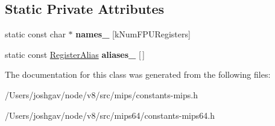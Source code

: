 \subsection*{Static Private Attributes}
\begin{DoxyCompactItemize}
\item 
static const char $\ast$ {\bfseries names\+\_\+} \mbox{[}k\+Num\+F\+P\+U\+Registers\mbox{]}\hypertarget{classv8_1_1internal_1_1_f_p_u_registers_a6ff89219befbbfa9aad365f231ca0cb7}{}\label{classv8_1_1internal_1_1_f_p_u_registers_a6ff89219befbbfa9aad365f231ca0cb7}

\item 
static const \hyperlink{structv8_1_1internal_1_1_f_p_u_registers_1_1_register_alias}{Register\+Alias} {\bfseries aliases\+\_\+} \mbox{[}$\,$\mbox{]}\hypertarget{classv8_1_1internal_1_1_f_p_u_registers_a55c8a4e34474ebc96b05269645cdc7ec}{}\label{classv8_1_1internal_1_1_f_p_u_registers_a55c8a4e34474ebc96b05269645cdc7ec}

\end{DoxyCompactItemize}


The documentation for this class was generated from the following files\+:\begin{DoxyCompactItemize}
\item 
/\+Users/joshgav/node/v8/src/mips/constants-\/mips.\+h\item 
/\+Users/joshgav/node/v8/src/mips64/constants-\/mips64.\+h\end{DoxyCompactItemize}
